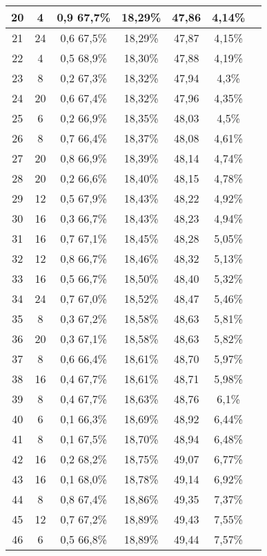 \begin{longtable}{|c|c|c|c|c|c|c|}
20 & 4 & 0,9 67,7\% & 18,29\% & 47,86 & 4,14\% \\ \hline
21 & 24 & 0,6 67,5\% & 18,29\% & 47,87 & 4,15\% \\ \hline
22 & 4 & 0,5 68,9\% & 18,30\% & 47,88 & 4,19\% \\ \hline
23 & 8 & 0,2 67,3\% & 18,32\% & 47,94 & 4,3\% \\ \hline
24 & 20 & 0,6 67,4\% & 18,32\% & 47,96 & 4,35\% \\ \hline
25 & 6 & 0,2 66,9\% & 18,35\% & 48,03 & 4,5\% \\ \hline
26 & 8 & 0,7 66,4\% & 18,37\% & 48,08 & 4,61\% \\ \hline
27 & 20 & 0,8 66,9\% & 18,39\% & 48,14 & 4,74\% \\ \hline
28 & 20 & 0,2 66,6\% & 18,40\% & 48,15 & 4,78\% \\ \hline
29 & 12 & 0,5 67,9\% & 18,43\% & 48,22 & 4,92\% \\ \hline
30 & 16 & 0,3 66,7\% & 18,43\% & 48,23 & 4,94\% \\ \hline
31 & 16 & 0,7 67,1\% & 18,45\% & 48,28 & 5,05\% \\ \hline
32 & 12 & 0,8 66,7\% & 18,46\% & 48,32 & 5,13\% \\ \hline
33 & 16 & 0,5 66,7\% & 18,50\% & 48,40 & 5,32\% \\ \hline
34 & 24 & 0,7 67,0\% & 18,52\% & 48,47 & 5,46\% \\ \hline
35 & 8 & 0,3 67,2\% & 18,58\% & 48,63 & 5,81\% \\ \hline
36 & 20 & 0,3 67,1\% & 18,58\% & 48,63 & 5,82\% \\ \hline
37 & 8 & 0,6 66,4\% & 18,61\% & 48,70 & 5,97\% \\ \hline
38 & 16 & 0,4 67,7\% & 18,61\% & 48,71 & 5,98\% \\ \hline
39 & 8 & 0,4 67,7\% & 18,63\% & 48,76 & 6,1\% \\ \hline
40 & 6 & 0,1 66,3\% & 18,69\% & 48,92 & 6,44\% \\ \hline
41 & 8 & 0,1 67,5\% & 18,70\% & 48,94 & 6,48\% \\ \hline
42 & 16 & 0,2 68,2\% & 18,75\% & 49,07 & 6,77\% \\ \hline
43 & 16 & 0,1 68,0\% & 18,78\% & 49,14 & 6,92\% \\ \hline
44 & 8 & 0,8 67,4\% & 18,86\% & 49,35 & 7,37\% \\ \hline
45 & 12 & 0,7 67,2\% & 18,89\% & 49,43 & 7,55\% \\ \hline
46 & 6 & 0,5 66,8\% & 18,89\% & 49,44 & 7,57\% \\ \hline

\end{longtable}

